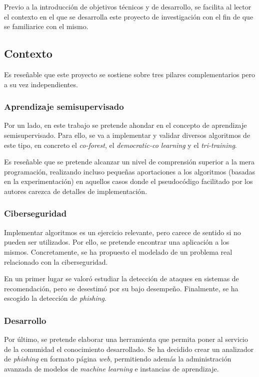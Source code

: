 
Previo a la introducción de objetivos técnicos y de desarrollo, se facilita al lector el contexto en el que se desarrolla este proyecto de investigación con el fin de que se familiarice con el mismo.

\subsection{Contexto}
\label{contexto}

Es reseñable que este proyecto se sostiene sobre tres pilares complementarios pero a su vez independientes.

\subsubsection{Aprendizaje semisupervisado}

Por un lado, en este trabajo se pretende ahondar en el concepto de aprendizaje semisupervisado. Para ello, se va a implementar y validar diversos algoritmos de este tipo, en concreto el \textit{co-forest}, el \textit{democratic-co learning} y el \textit{tri-training}.

Es reseñable que se pretende alcanzar un nivel de comprensión superior a la mera programación, realizando incluso pequeñas aportaciones a los algoritmos (basadas en la experimentación) en aquellos casos donde el pseudocódigo facilitado por los autores carezca de detalles de implementación.

\subsubsection{Ciberseguridad}

Implementar algoritmos es un ejercicio relevante, pero carece de sentido si no pueden ser utilizados. Por ello, se pretende encontrar una aplicación a los mismos. Concretamente, se ha propuesto el modelado de un problema real relacionado con la ciberseguridad.

En un primer lugar se valoró estudiar la detección de ataques en sistemas de recomendación, pero se desestimó por su bajo desempeño. Finalmente, se ha escogido la detección de \textit{phishing}.


\subsubsection{Desarrollo}

Por último, se pretende elaborar una herramienta que permita poner al servicio de la comunidad el conocimiento desarrollado. Se ha decidido crear un analizador de \textit{phishing} en formato página \textit{web}, permitiendo además la administración avanzada de modelos de \textit{machine learning} e instancias de aprendizaje.


